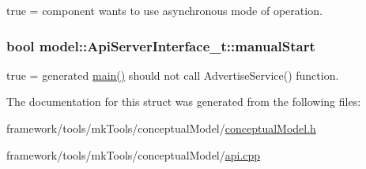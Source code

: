 true = component wants to use asynchronous mode of operation. 

\subsubsection[{\texorpdfstring{manual\+Start}{manualStart}}]{\setlength{\rightskip}{0pt plus 5cm}bool model\+::\+Api\+Server\+Interface\+\_\+t\+::manual\+Start}\hypertarget{structmodel_1_1_api_server_interface__t_a197872d1a9fc3af208e897af61012eca}{}\label{structmodel_1_1_api_server_interface__t_a197872d1a9fc3af208e897af61012eca}


true = generated \hyperlink{start_8c_a3c04138a5bfe5d72780bb7e82a18e627}{main()} should not call Advertise\+Service() function. 



The documentation for this struct was generated from the following files\+:\begin{DoxyCompactItemize}
\item 
framework/tools/mk\+Tools/conceptual\+Model/\hyperlink{conceptual_model_8h}{conceptual\+Model.\+h}\item 
framework/tools/mk\+Tools/conceptual\+Model/\hyperlink{api_8cpp}{api.\+cpp}\end{DoxyCompactItemize}
